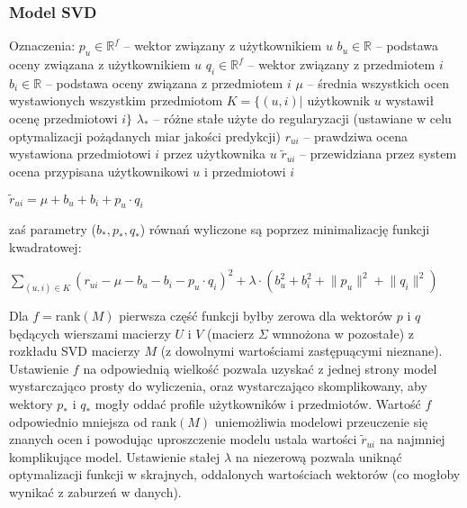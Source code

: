 \documentclass{pracamgr}
\begin{document}
    \subsubsection{Model SVD}
     Oznaczenia:\newline
     $p_u\in\mathbb{R}^f$ -- wektor związany z użytkownikiem $u$\newline
     $b_u\in\mathbb{R}$ -- podstawa oceny związana z użytkownikiem $u$\newline
     $q_i\in\mathbb{R}^f$ -- wektor związany z przedmiotem $i$\newline
     $b_i\in\mathbb{R}$ -- podstawa oceny związana z przedmiotem $i$\newline
     $\mu$ -- średnia wszystkich ocen wystawionych wszystkim przedmiotom\newline
     $K=\{(u,i)|$ użytkownik $u$ wystawił ocenę przedmiotowi $i\}$\newline
     $\lambda_{*}$ -- różne stałe użyte do regularyzacji (ustawiane w celu optymalizacji pożądanych miar jakości predykcji)\newline 
     $r_{ui}$ -- prawdziwa ocena wystawiona przedmiotowi $i$ przez użytkownika $u$\newline
     $\tilde{r}_{ui}$ -- przewidziana przez system ocena przypisana użytkownikowi $u$ i przedmiotowi $i$\newline
     \begin{center}
     $\tilde{r}_{ui}=\mu+b_u+b_i+p_u\cdot q_i$
     \end{center}
     zaś parametry ($b_*,p_*,q_*$) równań wyliczone są poprzez minimalizację funkcji kwadratowej:
     \begin{center}
     $\sum\limits_{(u,i)\in K}(r_{ui}-\mu-b_u-b_i-p_u\cdot q_i)^2+\lambda\cdot(b_u^2+b_i^2+\lVert p_u\rVert^2+\lVert q_i\rVert^2)$
     \end{center}
     Dla $f=$rank$(M)$ pierwsza część funkcji byłby zerowa dla wektorów $p$ i $q$ będących wierszami macierzy $U$ i $V$
     (macierz $\Sigma$ wmnożona w pozostałe) z rozkładu SVD macierzy $M$ (z dowolnymi wartościami zastępuącymi nieznane).
     Ustawienie $f$ na odpowiednią wielkość pozwala uzyskać z jednej strony model wystarczająco prosty do wyliczenia,
     oraz wystarczająco skomplikowany, aby wektory $p_*$ i $q_*$ mogły oddać profile użytkowników i przedmiotów.
     Wartość $f$ odpowiednio mniejsza od rank$(M)$ uniemożliwia modelowi przeuczenie się znanych ocen i powodując uproszczenie modelu
     ustala wartości $\tilde{r}_{ui}$ na najmniej komplikujące model.
     Ustawienie stałej $\lambda$ na niezerową pozwala uniknąć optymalizacji funkcji w skrajnych, oddalonych wartościach wektorów
     (co mogłoby wynikać z zaburzeń w danych).
\end{document}
